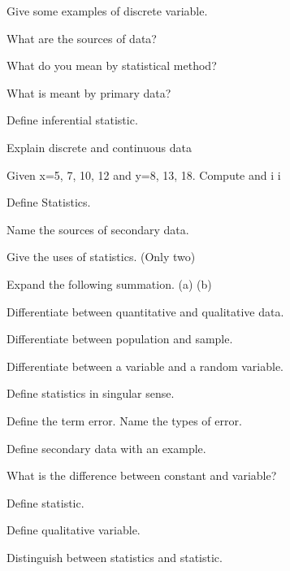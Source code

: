 \documentclass[11pt,a4paper]{article}
\begin{document}
\begin{shortlist}
\item Give some examples of discrete variable.

\item What are the sources of data?

\item What do you mean by statistical method?

\item What is meant by primary data?

\item Define inferential statistic.

\item Explain discrete and continuous data

\item Given x=5, 7, 10, 12 and y=8, 13, 18. Compute and i i

\item Define Statistics.

\item Name the sources of secondary data.

\item Give the uses of statistics. (Only two)

\item Expand the following summation. (a) (b)

\item Differentiate between quantitative and qualitative data.

\item Differentiate between population and sample.

\item Differentiate between a variable and a random variable.

\item Define statistics in singular sense.

\item Define the term error. Name the types of error.

\item Define secondary data with an example.

\item What is the difference between constant and variable?

\item Define statistic.

\item Define qualitative variable.

\item Distinguish between statistics and statistic.


\end{shortlist}
\end{document}
